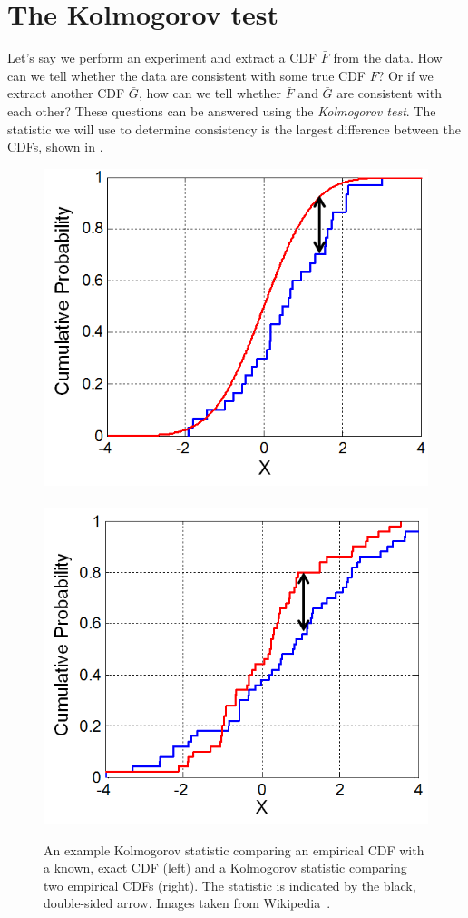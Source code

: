 \section{The Kolmogorov test}\label{sec:kolm}
Let's say we perform an experiment and extract a CDF $\bar{F}$ from 
the data. How can we tell whether the data are consistent with some
true CDF $F$? Or if we extract another CDF $\bar{G}$, how can
we tell whether $\bar{F}$ and $\bar{G}$ are consistent with each other?
These questions can be answered using the {\it Kolmogorov test}.
The statistic we will use to determine consistency is the
largest difference between the CDFs, shown in
.

\begin{figure}
\includegraphics[width=0.45\linewidth]{figs/KS_Example.png}~~~
\includegraphics[width=0.45\linewidth]{figs/KS2_Example.png}
\caption{An example Kolmogorov statistic comparing an empirical CDF
with a known, exact CDF (left)  and a Kolmogorov statistic comparing
two empirical CDFs (right). The statistic is indicated by the black,
double-sided arrow. Images taken from 
Wikipedia~\cite{Wiki_kolm}.}
\label{fig:kolm}
\end{figure}

